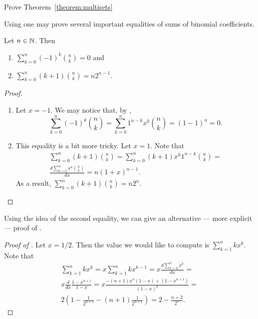 \begin{exercise}
  Prove Theorem~\ref{theorem:multisets}
\end{exercise}

Using  one may prove several important equalities of sums
of binomial coefficients.
\begin{corollary}
\label{corollary:binommials-equality}
  Let $n \in {\mathbb{N}}$. Then
  \begin{enumerate}
    \item $\sum_{k = 0}^n (-1)^k \binom{n}{k} = 0$ and
    \item $\sum_{k = 0}^n (k + 1) \binom{n}{k} = n 2^{n - 1}$.
  \end{enumerate}
\end{corollary}
\begin{proof}
  \begin{enumerate}
    \item Let $x = -1$. We may notice that, by , 
      \[
        \sum_{k = 0}^n (-1)^k \binom{n}{k} = 
        \sum_{k = 0}^n 1^{n - k} x^k \binom{n}{k} = (1 - 1)^n = 0.
      \]
    \item This equality is a bit more tricky. Let $x = 1$. Note that
      \begin{multline*}
        \sum_{k = 0}^n (k + 1) \binom{n}{k} = 
        \sum_{k = 0}^n (k + 1) x^k 1^{n - k} \binom{n}{k} = \\
        \frac{d \sum_{k = 0}^n x^k \binom{n}{k}}{dx} = n (1 + x)^{n - 1}.
      \end{multline*}
      As a result, $\sum_{k = 0}^n (k + 1) \binom{n}{k} = n 2^n$.
  \end{enumerate}
\end{proof}


Using the idea of the second equality, we can give an alternative --- more
explicit --- proof of .
\begin{proof}[Proof of ]
\label{proof-claim:guess-one-out-of-many}
  Let $x = 1 / 2$. Then the value we would like to compute is 
  $\sum_{k = 1}^n k x^k$. Note that
  \begin{multline*}
    \sum_{k = 1}^n k x^k = x \sum_{k = 1}^n k x^{k - 1} =
    x \frac{d \sum_{k = 0}^n x^k}{dx} = \\
    x \frac{d}{dx} \frac{1 - x^{n + 1}}{1 - x} = 
    x \frac{-(n + 1) x^n (1 - x) + (1 - x^{n + 1})}{(1 - x)^2} =  \\
    2\left(
      1 - \frac{1}{2^{n + 1}} - (n + 1) \frac{1}{2^{n + 1}}
    \right) = 2 - \frac{n + 2}{2^n}.
  \end{multline*}
\end{proof}


